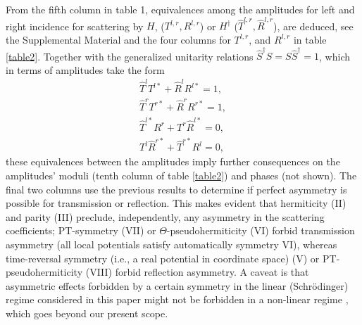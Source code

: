 From the fifth column in table 1, equivalences among the amplitudes for left and right incidence
for scattering by $H$, ($T^{l,r}, R^{l,r}$) or $H^\dagger$  ($\widehat{T}^{l,r}, \widehat{R}^{l,r}$),
are deduced, see the Supplemental Material  and the four columns for
$T^{l,r}$, and $R^{l,r}$ in table \ref{table2}.
Together with the generalized unitarity relations $\widehat{S}^\dagger S=S\widehat{S}^\dagger=1$,
which in terms of amplitudes take the form \cite{Muga2004}
%
\begin{eqnarray}
\widehat T^l T^{l*} + \widehat R^l R^{l*} = 1,
\nonumber\\
\widehat T^r T^{r*} + \widehat R^r R^{r*} = 1,
\nonumber\\
\hat T^{l*} R^r + T^r \widehat R^{l*} = 0,
\nonumber\\
T^l \widehat R^{r*} + \widehat T^{r*} R^l = 0,
\label{gur}
\end{eqnarray}
%
these equivalences  between the amplitudes
 imply further consequences on the amplitudes' moduli (tenth column of table \ref{table2}) and phases (not shown).
 The final two columns use the previous results to determine if perfect asymmetry is possible for transmission or reflection.
 This makes evident that hermiticity (II) and parity (III) preclude, independently, any asymmetry in the scattering coefficients;
 PT-symmetry (VII) or  $\Theta$-pseudohermiticity
 (VI) forbid transmission asymmetry (all local potentials  satisfy automatically
 symmetry VI),  whereas time-reversal symmetry (i.e., a real potential in coordinate space)
 (V) or  PT-pseudohermiticity (VIII) forbid reflection asymmetry.
 A caveat is that asymmetric effects forbidden by a certain symmetry in the linear (Schr\"odinger)
 regime considered in this paper might not be forbidden in a non-linear regime \cite{Xu2014}, which goes beyond our present scope.



